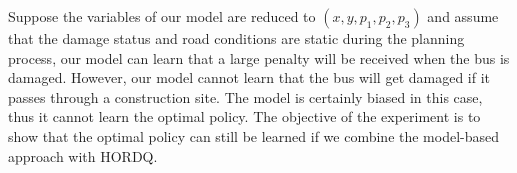 
Suppose the variables of our model are reduced to $(x, y, p_1, p_2, p_3)$ and assume
that the damage status and road conditions are static during the planning
process, our model can learn that a large penalty will be received when the bus
is damaged. However, our model cannot learn that the bus will get damaged if
it passes through a construction site. The model is certainly biased in this
case, thus it cannot learn the optimal policy. The objective of the experiment
is to show that the optimal policy can still be learned if we combine the
model-based approach with HORDQ. 



